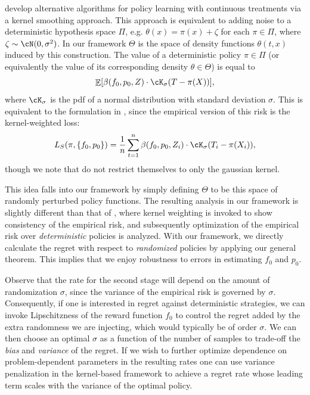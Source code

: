 \documentclass[11pt]{article} %
\theoremstyle{theorem}  %
\theoremstyle{plain}
\DeclarePairedDelimiter{\brk}{[}{]}
\DeclarePairedDelimiter{\crl}{\{}{\}}
\DeclareMathOperator{\En}{\mathbb{E}}
\newcommand{\target}{\Theta}
\begin{document}
\cite{kallus2018policy} develop alternative algorithms for policy learning with continuous treatments via a kernel smoothing approach. This approach is equivalent to adding noise to a deterministic hypothesis space $\Pi$, e.g. $\theta(x) = \pi(x) + \zeta$ for each $\pi\in \Pi$, where $\zeta\sim \cN(0, \sigma^2)$. In our framework $\target$ is the space of density functions $\theta(t,x)$ induced by this construction. The value of a deterministic policy $\pi\in \Pi$ (or equivalently the value of its corresponding density $\theta\in \target$) is equal to
\begin{equation}
\En\brk*{\beta(f_0,p_0, Z) \cdot \cK_{\sigma}(T - \pi(X))},
\end{equation}
where $\cK_\sigma$ is the pdf of a normal distribution with standard deviation $\sigma$. This is equivalent to the formulation in \cite{kallus2018policy}, since the empirical version of this risk is the kernel-weighted loss: \begin{equation}
L_S(\pi, \crl{f_0, p_0}) = \frac{1}{n} \sum_{t=1}^n {\beta(f_0,p_0, Z_i) \cdot \cK_{\sigma}(T_i - \pi(X_i))},
\end{equation}
though we note that \cite{kallus2018policy} do not restrict themselves to only the gaussian kernel.

This idea falls into our framework by simply defining $\target$ to be this space of randomly perturbed policy functions. The resulting analysis in our framework is slightly different than that of \cite{kallus2018policy}, where kernel weighting is invoked to show consistency of the empirical risk, and subsequently optimization of the empirical risk over \emph{deterministic} policies is analyzed. With our framework, we directly calculate the regret with respect to \emph{randomized} policies by applying our general theorem. This implies that we enjoy robustness to errors in estimating $f_0$ and $p_0$. 

Observe that the rate for the second stage will depend on the amount of randomization $\sigma$, since the variance of the empirical risk is governed by $\sigma$. Consequently, if one is interested in regret against deterministic strategies, we can invoke Lipschitzness of the reward function $f_0$ to control the regret added by the extra randomness we are injecting, which would typically be of order $\sigma$. We can then choose an optimal $\sigma$ as a function of the number of samples to trade-off the \emph{bias} and \emph{variance} of the regret. If we wish to further optimize dependence on problem-dependent parameters in the resulting rates one can use variance penalization in the kernel-based framework to achieve a regret rate whose leading term scales with the variance of the optimal policy.
\end{document}
